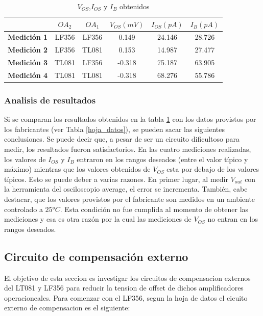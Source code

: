 \documentclass[12pt,a4paper]{article}
\begin{document}
\begin{table}[ht]
    \centering
    \caption{$V_{OS}$,$I_{OS}$ y $I_B$ obtenidos}
    \label{table5}
    \begin{tabular}{@{}cccccc@{}}
    \textbf{}           & \textbf{$OA_2$} & \textbf{$OA_1$} & \textbf{$V_{OS} (mV)$}   & \textbf{$I_{OS} (pA)$} & \textbf{$I_B (pA)$} \\ \midrule
    \textbf{Medición 1} & LF356          & LF356      & 0.149                          & 24.146                 & 28.726             \\
    \textbf{Medición 2} & LF356          & TL081      & 0.153                          & 14.987                 & 27.477                  \\
    \textbf{Medición 3} & TL081          & LF356      & -0.318                         & 75.187                 & 63.905                  \\
    \textbf{Medición 4} & TL081          & TL081      & -0.318                         & 68.276                 & 55.786                  \\ 
    \end{tabular}
\end{table}


\subsubsection{Analisis de resultados}
Si se comparan los resultados obtenidos en la tabla \ref{table5} con los datos provistos por los fabricantes (ver Tabla \ref{hoja_datos}), se pueden sacar las siguientes conclusiones. Se puede decir que, a pesar de 
ser un circuito dificultoso para medir, los resultados fueron satisfactorios. En las cuatro mediciones realizadas, los valores de $I_{OS}$ y $I_B$ entraron en los rangos deseados (entre el valor típico y máximo) mientras 
que los valores obtenidos de $V_{OS}$ esta por debajo de los valores típicos. Esto se puede deber a varias razones. En primer lugar, al medir $V_{out}$ con la herramienta del osciloscopio average, el error se incrementa. También, cabe destacar, que
los valores provistos por el fabricante son medidos en un ambiente controlado a $25 °C$. Esta condición no fue cumplida al momento de obtener las mediciones y esa es otra razón por la cual las mediciones de $V_{OS}$ no entran en los rangos deseados.   

\subsection{Circuito de compensación externo}
El objetivo de esta seccion es investigar los circuitos de compensacion externos del LT081 y LF356 para reducir la tension de offset de dichos amplificadores operacioneales.
Para comenzar con el LF356, segun la hoja de datos el cicuito externo de compensacion es el siguiente: 
\end{document}

